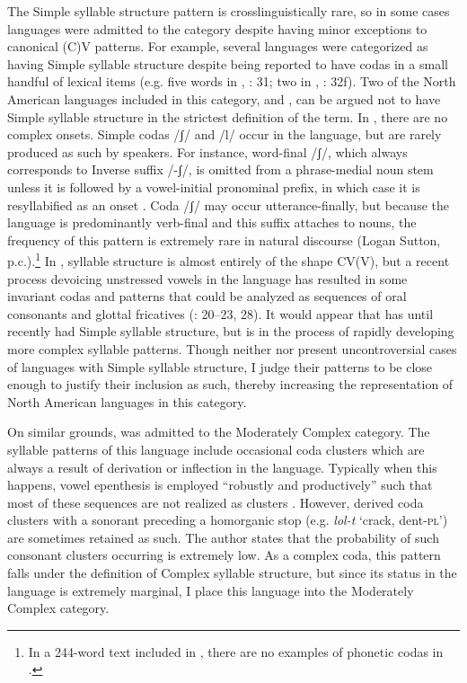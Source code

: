   The Simple syllable structure pattern is crosslinguistically rare, so in some cases languages were admitted to the category despite having minor exceptions to canonical (C)V patterns. For example, several languages were categorized as having Simple syllable structure despite being reported to have codas in a small handful of lexical items (e.g. five words in , \citealt{Guillaume2008}: 31; two in , \citealt{Pan2012}: 32f). Two of the North American languages included in this category,  and , can be argued not to have Simple syllable structure in the strictest definition of the term. In , there are no complex onsets. Simple codas /ʃ/ and /l/ occur in the language, but are rarely produced as such by speakers. For instance, word-final /ʃ/, which always corresponds to Inverse suffix /-ʃ/, is omitted from a phrase-medial noun stem unless it is followed by a vowel-initial pronominal prefix, in which case it is resyllabified as an onset \citep[22--24]{Yumitani1998}. Coda /ʃ/ may occur utterance-finally, but because the language is predominantly verb-final and this suffix attaches to nouns, the frequency of this pattern is extremely rare in natural discourse (Logan Sutton, p.c.).\footnote{{In a 244-word text included in \citet{Yumitani1998}, there are no examples of phonetic codas in .}} In , syllable structure is almost entirely of the shape CV(V), but a recent process devoicing unstressed vowels in the language has resulted in some invariant codas and patterns that could be analyzed as sequences of oral consonants and glottal fricatives (\citealt{Givón2011}: 20--23, 28). It would appear that  has until recently had Simple syllable structure, but is in the process of rapidly developing more complex syllable patterns. Though neither  nor  present uncontroversial cases of languages with Simple syllable structure, I judge their patterns to be close enough to justify their inclusion as such, thereby increasing the representation of North American languages in this category. 

  On similar grounds,  was admitted to the Moderately Complex category. The syllable patterns of this language include occasional coda clusters which are always a result of derivation or inflection in the language. Typically when this happens, vowel epenthesis is employed “robustly and productively” such that most of these sequences are not realized as clusters \citep[55]{Filchenko2007}. However, derived coda clusters with a sonorant preceding a homorganic stop (e.g. \textit{lol-t} ‘crack, dent-\textsc{pl’}) are sometimes retained as such. The author states that the probability of such consonant clusters occurring is extremely low. As a complex coda, this pattern falls under the definition of Complex syllable structure, but since its status in the language is extremely marginal, I place this language into the Moderately Complex category.

